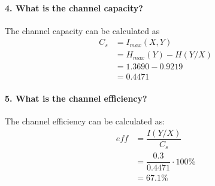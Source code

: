 \documentclass[Main]{subfiles}
\begin{document}
\paragraph{4.  What is the channel capacity?}
The channel capacity can be calculated as 
\begin{align}
C_s &= I_{max}(X,Y)\\
	&= H_{max}(Y) - H(Y/X)\\
	&= 1.3690 - 0.9219\\
	&= 0.4471
\end{align}


\paragraph{5.  What is the channel efficiency?}
The channel efficiency can be calculated as:
\begin{align}
eff &= \dfrac{I(Y/X)}{C_s} \\
	&= \dfrac{0.3}{0.4471} \cdot 100\% \\
	&= 67.1\%
\end{align}
\end{document}
